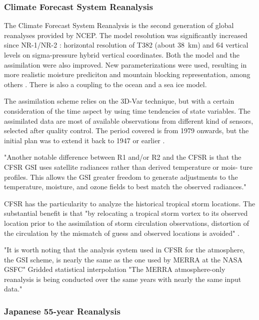 \documentclass{ametsoc}
\begin{document}
\subsubsection{Climate Forecast System Reanalysis}

The Climate Forecast System Reanalysis \citep[CFSR, ][]{Saha2010a} is the second generation of global reanalyses provided by NCEP. The model resolution was significantly increased since NR-1/NR-2 : horizontal resolution of T382 (about 38~km) and 64 vertical levels on sigma-pressure hybrid vertical coordinates. Both the model and the assimilation were also improved. New parameterizations were used, resulting in more realistic moisture prediciton and mountain blocking representation, among others \citep{Saha2010a}. There is also a coupling to the ocean and a sea ice model.

The assimilation scheme relies on the 3D-Var technique, but with a certain consideration of the time aspect by using time tendencies of state variables. The assimilated data are most of available observations from different kind of sensors, selected after quality control. The period covered is from 1979 onwards, but the initial plan was to extend it back to 1947 or earlier \citep{Saha2010a}.

"Another notable difference between R1 and/or
R2 and the CFSR is that the CFSR GSI uses satellite radiances rather than derived temperature or mois- ture profiles. This allows the GSI greater freedom to generate adjustments to the temperature, moisture, and ozone fields to best match the observed radiances."


CFSR has the particularity to analyze the historical tropical storm locations. The substantial benefit is that "by relocating a tropical storm vortex to its observed location prior to the assimilation of storm circulation observations, distortion of the circulation by the mismatch of guess and observed locations is avoided" \citep{Saha2010a}.



"It is worth noting that the analysis system used in CFSR for the atmosphere, the GSI scheme, is nearly the same as the one used by MERRA at the NASA GSFC"
Gridded statistical interpolation
"The MERRA atmosphere-only reanalysis is being conducted over the same years with nearly the same input data."

\subsubsection{Japanese 55-year Reanalysis}
\end{document}
